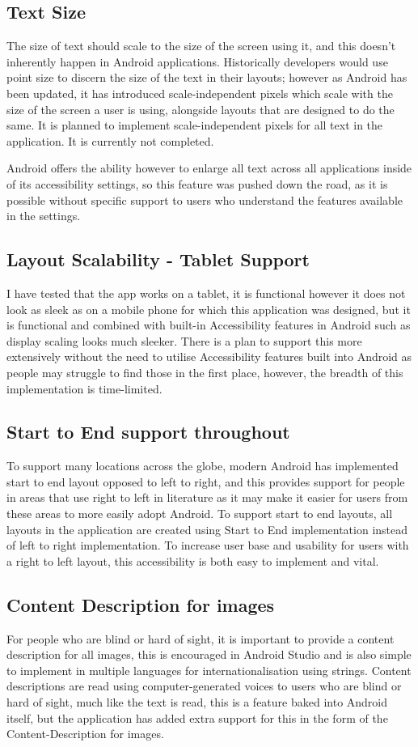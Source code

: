     \subsection{Text Size}
    The size of text should scale to the size of the screen using it, and this doesn't inherently happen in Android applications. Historically developers would use point size to discern the size of the text in their layouts; however as Android has been updated, it has introduced scale-independent pixels which scale with the size of the screen a user is using, alongside layouts that are designed to do the same. It is planned to implement scale-independent pixels for all text in the application. It is currently not completed.

Android offers the ability however to enlarge all text across all applications inside of its accessibility settings, so this feature was pushed down the road, as it is possible without specific support to users who understand the features available in the settings.
    \subsection{Layout Scalability - Tablet Support}
    I have tested that the app works on a tablet, it is functional however it does not look as sleek as on a mobile phone for which this application was designed, but it is functional and combined with built-in Accessibility features in Android such as display scaling looks much sleeker. There is a plan to support this more extensively without the need to utilise Accessibility features built into Android as people may struggle to find those in the first place, however, the breadth of this implementation is time-limited.
    \subsection{Start to End support throughout}
    To support many locations across the globe, modern Android has implemented start to end layout opposed to left to right, and this provides support for people in areas that use right to left in literature as it may make it easier for users from these areas to more easily adopt Android. To support start to end layouts, all layouts in the application are created using Start to End implementation instead of left to right implementation. To increase user base and usability for users with a right to left layout, this accessibility is both easy to implement and vital.
    \subsection{Content Description for images}
    For people who are blind or hard of sight, it is important to provide a content description for all images, this is encouraged in Android Studio and is also simple to implement in multiple languages for internationalisation using strings. Content descriptions are read using computer-generated voices to users who are blind or hard of sight, much like the text is read, this is a feature baked into Android itself, but the application has added extra support for this in the form of the Content-Description for images.